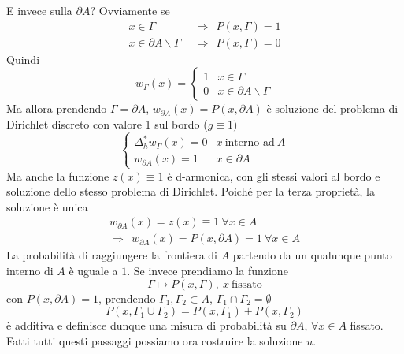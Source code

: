 \documentclass[10pt,a4paper,twoside,openright]{book}
\begin{document}
E invece sulla $\displaystyle \partial A$? Ovviamente se 
\begin{align*}
	x\in \Gamma                       & \ \ \Rightarrow \ \ P(x,\Gamma) =1 \\
	x\in \partial  A \backslash \Gamma & \ \ \Rightarrow \ \ P(x,\Gamma) =0 
\end{align*}
Quindi
\begin{equation*}
	w_{\Gamma }(x) =\begin{cases}
	1 & x\in \Gamma \\
	0 & x\in \partial A\backslash \Gamma 
	\end{cases}
\end{equation*}
Ma allora prendendo $\displaystyle \Gamma =\partial A$, $\displaystyle w_{\partial A}(x) =P(x,\partial A)$ è soluzione del problema di Dirichlet discreto con valore 1 sul bordo ($\displaystyle g\equiv 1)$
\begin{equation*}
	\begin{cases}
		\Delta ^{*}_{h} w_{\Gamma }(x) =0 & x\ \text{interno ad} \ A \\
		w_{\partial A}(x) =1              & x\in \partial A          
	\end{cases}
\end{equation*}
Ma anche la funzione $\displaystyle z(x) \equiv 1$ è d-armonica, con gli stessi valori al bordo e soluzione dello stesso problema di Dirichlet. Poiché per la terza proprietà, la soluzione è unica 
\begin{gather*}
	w_{\partial A}(x) =z(x) \equiv 1\ \forall x\in A\\
	\Rightarrow \ \ w_{\partial A}(x) =P(x,\partial A) =1\ \forall x\in A
\end{gather*}
La probabilità di raggiungere la frontiera di $\displaystyle A$ partendo da un qualunque punto interno di $\displaystyle A$ è uguale a $\displaystyle 1$. Se invece prendiamo la funzione
\begin{equation*}
	\Gamma \longmapsto P(x,\Gamma),\ x\ \text{fissato}
\end{equation*}
con $\displaystyle P(x,\partial A) =1$, prendendo $\displaystyle \Gamma _{1},\Gamma _{2} \subset A$, $\displaystyle \Gamma _{1} \cap \Gamma _{2} =\emptyset $
\begin{equation*}
	P( x,\Gamma _{1} \cup \Gamma _{2}) =P(x,\Gamma _{1}) +P(x,\Gamma _{2})
\end{equation*}
è additiva e definisce dunque una misura di probabilità su $\displaystyle \partial A$, $\displaystyle \forall x\in A$ fissato. Fatti tutti questi passaggi possiamo ora costruire la soluzione $\displaystyle u$.
\end{document}
